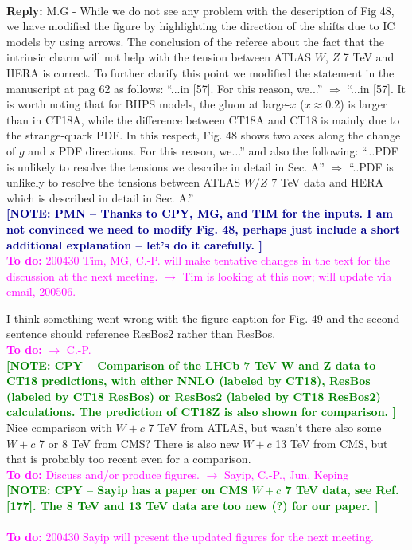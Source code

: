 \documentclass[aps,prd,amsmath,nofootinbib,floatfix,fleqn]{revtex4}
\newcommand{\TODO}[1]{\textcolor{magenta}{
\quad\vspace{3pt} \\ {\bf To do:} #1 \\
}}
\newcommand{\REPLY}[1]{\textcolor{redish}{\quad \\
{\bf Reply:} #1 \\
}}
\newcommand{\NOTECPY}[1]{\textcolor{green}{ \bf[NOTE: CPY -- #1 ]}}
\newcommand{\NOTEPN}[1]{\textcolor{darkblue}{ \bf[NOTE: PMN -- #1 ]}}
\begin{document}
\REPLY{M.G - While we do not see any problem with the description of Fig 48, we have modified the figure
by highlighting the direction of the shifts due to IC models by using arrows. The conclusion of the referee about the fact that
the intrinsic charm will not help with the tension between ATLAS $W$, $Z$ 7 TeV and HERA is correct.
\newline
%
To further clarify this point we modified the statement in the manuscript at pag 62 as follows:
\newline
\newline
``...in [57]. For this reason, we...'' $\Longrightarrow$ ``...in [57]. It is worth noting that for BHPS models, the gluon at large-$x$ ($x\approx 0.2$) is larger than in CT18A,
while the difference between CT18A and CT18 is mainly due to the strange-quark PDF. In this respect, Fig. 48 shows two axes along the change of $g$ and $s$ PDF directions.
For this reason, we...''
\newline
\newline
and also the following:
\newline
\newline
``...PDF is unlikely to resolve the tensions we describe in detail in Sec. A'' $\Longrightarrow$ ``..PDF is unlikely to resolve the tensions between ATLAS $W/Z$ 7 TeV data
and HERA which is described in detail in Sec. A.''}
\NOTEPN{Thanks to CPY, MG, and TIM for the inputs. I am not convinced we need to modify Fig. 48, perhaps just include a short additional  explanation -- let's do it carefully.}
\TODO{200430 Tim, MG, C.-P. will make tentative changes in the text for the discussion at the next meeting. $\to$ Tim is looking at this now; will update via email, 200506.}

\noindent
I think something went wrong with the figure caption for Fig. 49 and the second sentence should
reference ResBos2 rather than ResBos.  
\TODO{$\to$ C.-P.}
\NOTECPY{Comparison of the LHCb 7 TeV W and Z data to CT18 predictions, with either NNLO (labeled by CT18), ResBos (labeled by CT18 ResBos) or ResBos2 (labeled by CT18 ResBos2) calculations. The prediction of CT18Z is also shown for comparison.}\\

\noindent
Nice comparison with $W+c$ 7 TeV from ATLAS, but wasn’t there also some $W+c$ 7 or 8 TeV from
CMS? There is also new $W+c$ 13 TeV from CMS, but that is probably too recent even for a comparison.
\TODO{Discuss and/or produce figures. $\to$ Sayip, C.-P., Jun, Keping}
\NOTECPY{Sayip has a paper on CMS $W+c$ 7 TeV data, see Ref. [177]. 
The 8 TeV and 13 TeV data are too new (?)  for our paper.}\\
\TODO{200430 Sayip will present the updated figures for the next meeting.}
\end{document}

